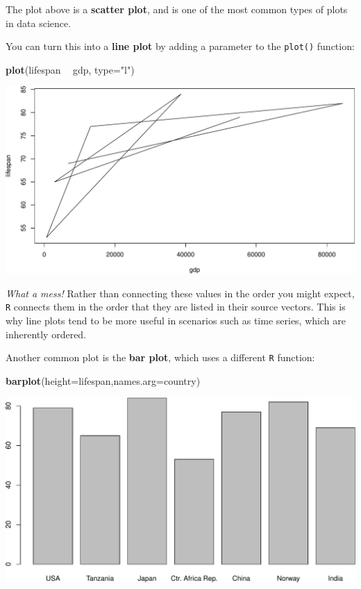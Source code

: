 \documentclass[
]{book}
\newenvironment{Shaded}{\begin{snugshade}}{\end{snugshade}}
\newcommand{\DataTypeTok}[1]{\textcolor[rgb]{0.13,0.29,0.53}{#1}}
\newcommand{\KeywordTok}[1]{\textcolor[rgb]{0.13,0.29,0.53}{\textbf{#1}}}
\newcommand{\NormalTok}[1]{#1}
\newcommand{\OperatorTok}[1]{\textcolor[rgb]{0.81,0.36,0.00}{\textbf{#1}}}
\newcommand{\StringTok}[1]{\textcolor[rgb]{0.31,0.60,0.02}{#1}}
\begin{document}
The plot above is a \textbf{scatter plot}, and is one of the most common types of plots in data science.

You can turn this into a \textbf{line plot} by adding a parameter to the \texttt{plot()} function:

\begin{Shaded}
\begin{Highlighting}[]
\KeywordTok{plot}\NormalTok{(lifespan }\OperatorTok{~}\StringTok{ }\NormalTok{gdp, }\DataTypeTok{type=}\StringTok{"l"}\NormalTok{)}
\end{Highlighting}
\end{Shaded}

\includegraphics{figures/unnamed-chunk-98-1.pdf}

\emph{What a mess!} Rather than connecting these values in the order you might expect, \texttt{R} connects them in the order that they are listed in their source vectors. This is why line plots tend to be more useful in scenarios such as time series, which are inherently ordered.

Another common plot is the \textbf{bar plot}, which uses a different \texttt{R} function:

\begin{Shaded}
\begin{Highlighting}[]
\KeywordTok{barplot}\NormalTok{(}\DataTypeTok{height=}\NormalTok{lifespan,}\DataTypeTok{names.arg=}\NormalTok{country)}
\end{Highlighting}
\end{Shaded}

\includegraphics{figures/unnamed-chunk-99-1.pdf}
\end{document}
